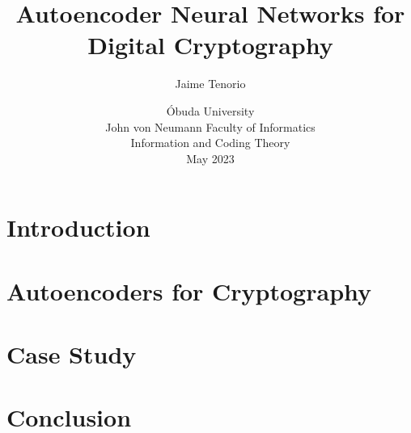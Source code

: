 \documentclass{article}
\title{Autoencoder Neural Networks for Digital Cryptography}
\author{Jaime Tenorio}
\date{Óbuda University \\ John von Neumann Faculty of Informatics \\ Information and Coding Theory \\ May 2023}
\begin{document}
\maketitle

\section{Introduction}


\section{Autoencoders for Cryptography}


\section{Case Study}


\section{Conclusion}


\printbibliography
\end{document}
